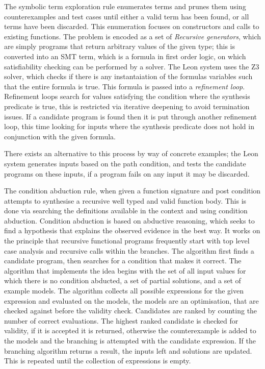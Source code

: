 \documentclass[a4paper]{article}
\begin{document}
The symbolic term exploration rule enumerates terms and prunes them using counterexamples and test cases until 
either a valid term has been found, or all terms have been discarded. This enumeration focuses on constructors and calls to 
existing functions. The problem is encoded as a set of \emph{Recursive generators}, which are simply programs that return arbitrary
values of the given type; this is converted into an SMT term, which is a formula in first order logic, on which satisfiability checking can be performed by a solver. The Leon system uses the Z3 solver, which checks if there is any instantaiation of the formulas variables such that the entire formula is true. This formula is passed into a \emph{refinement loop}.
Refinement loops search for values satisfying the condition where the synthesis predicate is true, this is restricted via iterative deepening to avoid termination issues. If a candidate program is found then it 
is put through another refinement loop, this time looking for inputs where the synthesis predicate does not hold in conjunction with the given formula. 

There exists an alternative to this process by way of concrete examples; the Leon system generates inputs 
based on the path condition, and tests the candidate programs on these inputs, if a program fails on any input it may be
discarded. 

The condition abduction rule, when given a function signature and post condition attempts to synthesise a recursive 
well typed and valid function body. This is done via searching the definitions available in the context and using 
condition abduction. Condition abduction is based on abductive reasoning, which seeks to find a hypothesis that explains the 
observed evidence in the best way. It works on the principle that recursive functional programs frequently start with top 
level case analysis and recursive calls within the branches. The algorithm first finds a candidate program, then searches
for a condition that makes it correct. The algorithm that implements the idea begins with the set of all input values 
for which there is no condition abducted, a set of partial solutions, and a set of example models. The algorithm collects 
all possible expressions for the given expression and evaluated on the models, the models are an optimisation, that are 
checked against before the validity check. Candidates are ranked by counting the number of correct evaluations. The highest ranked candidate is checked 
for validity, if it is accepted it is returned, otherwise the counterexample is added to the models and the branching is 
attempted with the candidate expression. If the branching algorithm returns a result, the inputs left and solutions are
updated. This is repeated until the collection of expressions is empty. 
\end{document}
